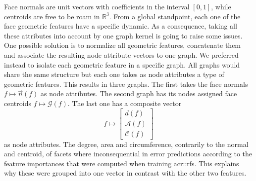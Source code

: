        Face normals are unit vectors with coefficients in the interval \([0, 1]\), while centroids are free to be roam in \(\mathbb{R}^3\).
        From a global standpoint, each one of the face geometric features have a specific dynamic.
        As a consequence, taking all these attributes into account by one graph kernel is going to raise some issues.
        One possible solution is to normalize all geometric features, concatenate them and associate the resulting node attribute vectors to one graph.
        We preferred instead to isolate each geometric feature in a specific graph.
        All graphs would share the same structure but each one takes as node attributes a type of geometric features.
        This results in three graphs.
        The first takes the face normals \(f \mapsto \vec{n}\left(f\right)\) as node attributes.
        The second graph has its nodes assigned face centroids \(f \mapsto \mathscr{G}\left(f\right)\).
        The last one has a composite vector
        \begin{equation*}
            f \mapsto \begin{bmatrix}
                d\left(f\right)\\
                \mathscr{A}\left(f\right)\\
                \mathscr{C}\left(f\right)
            \end{bmatrix}
        \end{equation*} as node attributes.
        The degree, area and circumference, contrarily to the normal and centroid, of facets where inconsequential in error predictions according to the feature importances that were computed when training \glspl{acr::rf}.
        This explains why these were grouped into one vector in contrast with the other two features.\\

